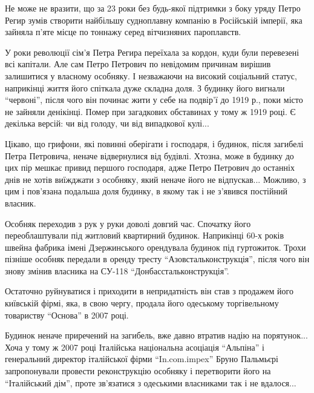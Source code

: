 Не може не вразити, що за 23 роки без будь-якої підтримки з боку уряду Петро
Регир зумів створити найбільшу судноплавну компанію в Російській імперії, яка
зайняла п'яте місце по тоннажу серед вітчизняних пароплавств.

У роки революції сім'я Петра Регира переїхала за кордон, куди були перевезені
всі капітали. Але сам Петро Петрович по невідомим причинам вирішив залишитися у
власному особняку. І незважаючи на високий соціальний статус, наприкінці життя
його спіткала дуже складна доля. З будинку його вигнали \enquote{червоні}, після чого
він починає жити у себе на подвір'ї до 1919 р., поки місто не зайняли
денікінці. Помер при загадкових обставинах у тому ж 1919 році. Є декілька
версій: чи від голоду, чи від випадкової кулі...


Цікаво, що грифони, які повинні оберігати і господаря, і будинок, після
загибелі Петра Петровича, неначе відвернулися від будівлі. Хтозна, може в
будинку до цих пір мешкає привид першого господаря, адже Петро Петрович до
останніх днів не хотів виїжджати з особняку, який неначе його не відпускав...
Можливо, з цим і пов'язана подальша доля будинку, в якому так і не з'явився
постійний власник.

Особняк переходив з рук у руки доволі довгий час. Спочатку його переоблаштували
під житловий квартирний будинок. Наприкінці 60-х років швейна фабрика імені
Дзержинського орендувала будинок під гуртожиток. Трохи пізніше особняк передали
в оренду тресту \enquote{Азовстальконструкція}, після чого він знову змінив власника на
СУ-118 \enquote{Донбасстальконструкція}.

Остаточно руйнуватися і приходити в непридатність він став з продажем його
київській фірмі, яка, в свою чергу, продала його одеському торгівельному
товариству \enquote{Основа} в 2007 році.

Будинок неначе приречений на загибель, вже давно втратив надію на порятунок...
Хоча у тому ж 2007 році Італійська національна асоціація \enquote{Альпіна} і
генеральний директор італійської фірми \enquote{In.com.impex} Бруно Пальмьєрі
запропонували провести реконструкцію особняку і перетворити його на
\enquote{Італійський дім}, проте зв'язатися з одеськими власниками так і не вдалося...

